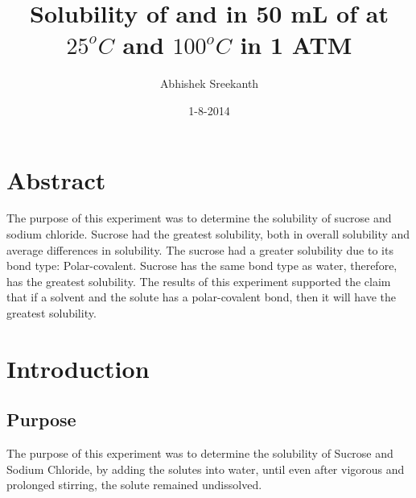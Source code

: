 \documentclass{article}
\begin{document}
\begin{titlepage}
\title{Solubility of  and  in 50 mL of  at $25^o C$ and $100^o C$ in 1 ATM}
\author{Abhishek Sreekanth}
\date{1-8-2014}
\maketitle
\thispagestyle{empty}
\end{titlepage}
\setcounter{page}{1}

\section*{Abstract}
The purpose of this experiment was to determine the solubility of sucrose and sodium chloride. Sucrose had the greatest solubility, both in overall solubility and average differences in solubility. The sucrose had a greater solubility due to its bond type: Polar-covalent. Sucrose has the same bond type as water, therefore, has the greatest solubility. The results of this experiment supported the claim that if a solvent and the solute has a polar-covalent bond, then it will have the greatest solubility. 
\pagebreak
\section*{Introduction} %
\subsection*{Purpose} %
The purpose of this experiment was to determine the solubility of Sucrose and Sodium Chloride, by adding the solutes into water, until even after vigorous and prolonged stirring, the solute remained undissolved. 
\end{document}
